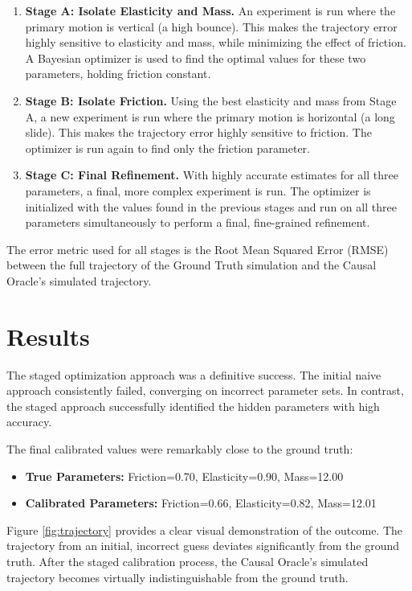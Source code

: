 \documentclass{article}
\begin{document}
\begin{enumerate}
\item \textbf{Stage A: Isolate Elasticity and Mass.} An experiment is run where the primary motion is vertical (a high bounce). This makes the trajectory error highly sensitive to elasticity and mass, while minimizing the effect of friction. A Bayesian optimizer is used to find the optimal values for these two parameters, holding friction constant.
\item \textbf{Stage B: Isolate Friction.} Using the best elasticity and mass from Stage A, a new experiment is run where the primary motion is horizontal (a long slide). This makes the trajectory error highly sensitive to friction. The optimizer is run again to find only the friction parameter.
\item \textbf{Stage C: Final Refinement.} With highly accurate estimates for all three parameters, a final, more complex experiment is run. The optimizer is initialized with the values found in the previous stages and run on all three parameters simultaneously to perform a final, fine-grained refinement.
\end{enumerate}

The error metric used for all stages is the Root Mean Squared Error (RMSE) between the full trajectory of the Ground Truth simulation and the Causal Oracle's simulated trajectory.

\section{Results}
The staged optimization approach was a definitive success. The initial naive approach consistently failed, converging on incorrect parameter sets. In contrast, the staged approach successfully identified the hidden parameters with high accuracy.

The final calibrated values were remarkably close to the ground truth:
\begin{itemize}
\item \textbf{True Parameters:} Friction=0.70, Elasticity=0.90, Mass=12.00
\item \textbf{Calibrated Parameters:} Friction=0.66, Elasticity=0.82, Mass=12.01
\end{itemize}

Figure \ref{fig:trajectory} provides a clear visual demonstration of the outcome. The trajectory from an initial, incorrect guess deviates significantly from the ground truth. After the staged calibration process, the Causal Oracle's simulated trajectory becomes virtually indistinguishable from the ground truth.
\end{document}
